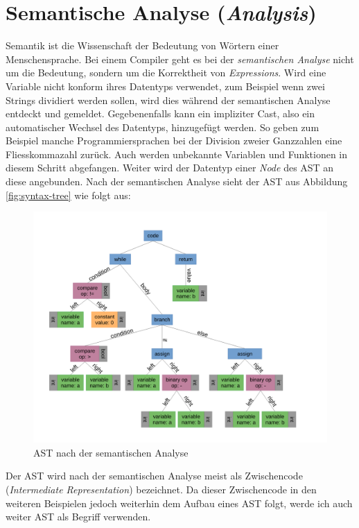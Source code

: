 \section{Semantische Analyse (\textit{Analysis})}
Semantik ist die Wissenschaft der Bedeutung von Wörtern einer Menschensprache. Bei einem Compiler geht es bei der \textit{semantischen Analyse} nicht um die Bedeutung, sondern um die Korrektheit von \textit{Expressions}.
Wird eine Variable nicht konform ihres Datentyps verwendet, zum Beispiel wenn zwei Strings dividiert werden sollen, wird dies während der semantischen Analyse entdeckt und gemeldet.
Gegebenenfalls kann ein impliziter Cast, also ein automatischer Wechsel des Datentyps, hinzugefügt werden.
So geben zum Beispiel manche Programmiersprachen bei der Division zweier Ganzzahlen eine Fliesskommazahl zurück.
Auch werden unbekannte Variablen und Funktionen in diesem Schritt abgefangen.
Weiter wird der Datentyp einer \textit{Node} des AST an diese angebunden. Nach der semantischen Analyse sieht der AST aus Abbildung \ref{fig:syntax-tree} wie folgt aus:

\begin{figure}[H]
    \centering
    \includegraphics[scale=0.4]{resources/images/AST_with_types.pdf}
    \caption[AST nach der semantischen Analyse (Basierend auf Abbildung \ref{fig:syntax-tree})]{AST nach der semantischen Analyse}
    \label{fig:syntax-tree-with-types}
\end{figure}

Der AST wird nach der semantischen Analyse meist als Zwischencode (\textit{Intermediate Representation}) bezeichnet.
Da dieser Zwischencode in den weiteren Beispielen jedoch weiterhin dem Aufbau eines AST folgt, werde ich auch weiter AST als Begriff verwenden.


